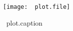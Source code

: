\begin{figure}[!h]
\begin{plotbox}[frametitle = {\textcolor{darkblue}{~plot.header}}]
\texttt{[image: ~plot.file]}
\caption{~plot.caption}
\label{~plot.label}
\end{plotbox}
\end{figure}
